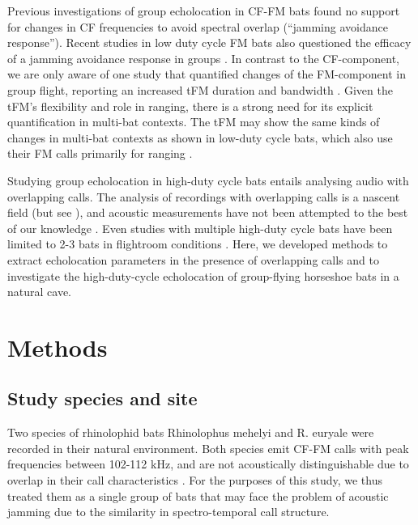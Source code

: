 \documentclass[
]{book}
\begin{document}
Previous investigations of group echolocation in CF-FM bats found no support for changes in CF frequencies to avoid spectral overlap (``jamming avoidance response'')\citep{jones1993a, jones1994individual, fawcett2015echolocation}. Recent studies in low duty cycle FM bats also questioned the efficacy of a jamming avoidance response in groups \citep{goetze2016a, cvikel2015b, mazar2020sensorimotor}. In contrast to the CF-component, we are only aware of one study that quantified changes of the FM-component in group flight, reporting an increased tFM duration and bandwidth \citep{fawcett2015echolocation}. Given the tFM's flexibility and role in ranging, there is a strong need for its explicit quantification in multi-bat contexts. The tFM may show the same kinds of changes in multi-bat contexts as shown in low-duty cycle bats, which also use their FM calls primarily for ranging \citep{fawcett2015clutter, amichai2015a, hase2018a}.

Studying group echolocation in high-duty cycle bats entails analysing audio with overlapping calls. The analysis of recordings with overlapping calls is a nascent field (but see \citet{izadi2019segmentation}), and acoustic measurements have not been attempted to the best of our knowledge . Even studies with multiple high-duty cycle bats have been limited to 2-3 bats in flightroom conditions \citep{fawcett2015echolocation, jones1993a, jones1994individual}. Here, we developed methods to extract echolocation parameters in the presence of overlapping calls and to investigate the high-duty-cycle echolocation of group-flying horseshoe bats in a natural cave.

\hypertarget{methods}{%
\section{Methods}\label{methods}}

\hypertarget{study-species-and-site}{%
\subsection{Study species and site}\label{study-species-and-site}}

Two species of rhinolophid bats Rhinolophus mehelyi and R. euryale were recorded in their natural environment. Both species emit CF-FM calls with peak frequencies between 102-112 kHz, and are not acoustically distinguishable due to overlap in their call characteristics \citep{dietz2016bats}. For the purposes of this study, we thus treated them as a single group of bats that may face the problem of acoustic jamming due to the similarity in spectro-temporal call structure.
\end{document}
